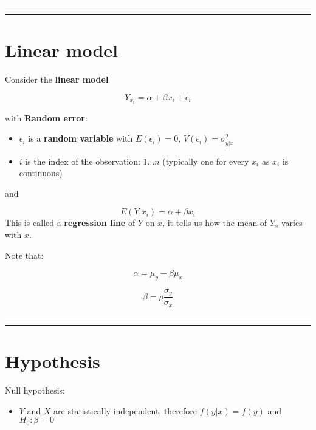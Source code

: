 \documentclass[
]{book}
\providecommand{\tightlist}{%
  \setlength{\itemsep}{0pt}\setlength{\parskip}{0pt}}
\begin{document}
\begin{center}\rule{0.5\linewidth}{0.5pt}\end{center}

\begin{center}\rule{0.5\linewidth}{0.5pt}\end{center}

\hypertarget{linear-model-3}{%
\section{Linear model}\label{linear-model-3}}

Consider the \textbf{linear model}

\[Y_{x_i} = \alpha + \beta x_i +\epsilon_{i}\]

with \textbf{Random error}:

\begin{itemize}
\item
  \(\epsilon_{i}\) is a \textbf{random variable} with \(E(\epsilon_{i})=0\), \(V(\epsilon_{i})=\sigma_{y|x}^2\)
\item
  \(i\) is the index of the observation: \(1...n\) (typically one for every \(x_i\) as \(x_i\) is continuous)
\end{itemize}

and

\[E(Y|x_i)=\alpha + \beta x_i\]
This is called a \textbf{regression line} of \(Y\) on \(x\), it tells us how the mean of \(Y_x\) varies with \(x\).

Note that:

\[\alpha=\mu_y-\beta\mu_x\]

\[\beta=\rho\frac{\sigma_y}{\sigma_x}\]

\begin{center}\rule{0.5\linewidth}{0.5pt}\end{center}

\begin{center}\rule{0.5\linewidth}{0.5pt}\end{center}

\hypertarget{hypothesis-6}{%
\section{Hypothesis}\label{hypothesis-6}}

Null hypothesis:

\begin{itemize}
\tightlist
\item
  \(Y\) and \(X\) are statistically independent, therefore \(f(y|x)=f(y)\) and \(H_0: \beta=0\)
\end{itemize}
\end{document}
